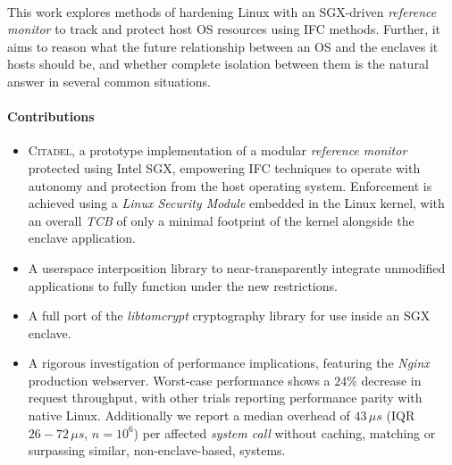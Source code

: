 \paragraph{} This work explores methods of hardening Linux with an SGX-driven \textit{reference monitor} to track and protect host OS resources using IFC methods. Further, it aims to reason what the future relationship between an OS and the enclaves it hosts should be, and whether complete isolation between them is the natural answer in several common situations.


\paragraph{Contributions}
\begin{itemize}
    \item \textsc{Citadel}, a prototype implementation of a modular \textit{reference monitor} protected using Intel SGX, empowering IFC techniques to operate with autonomy and protection from the host operating system. Enforcement is achieved using a \textit{Linux Security Module} embedded in the Linux kernel, with an overall \textit{TCB} of only a minimal footprint of the kernel alongside the enclave application.
    \item A userspace interposition library to near-transparently integrate unmodified applications to fully function under the new restrictions.
    \item A full port of the \textit{libtomcrypt} cryptography library for use inside an SGX enclave.
    \item A rigorous investigation of performance implications, featuring the \textit{Nginx} production webserver. Worst-case performance shows a $24$\% decrease in request throughput, with other trials reporting performance parity with native Linux. Additionally we report a median overhead of $43\,\mu s$ (IQR $26-72\,\mu s$, $n = 10^6$) per affected \textit{system call} without caching, matching or surpassing similar, non-enclave-based, systems.
\end{itemize}